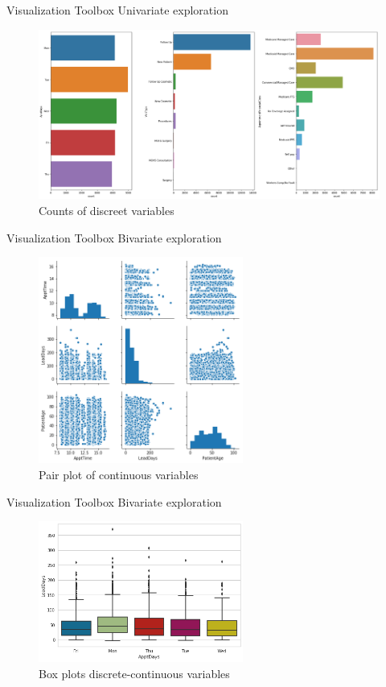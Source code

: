 \documentclass[10pt]{beamer}
\begin{document}
\begin{frame}{Visualization Toolbox}
Univariate exploration
	\begin{figure}	
		\caption{Counts of discreet variables}
		\includegraphics[width=1.1\textwidth, center, trim=0cm 0cm 0 0cm]{images/cat_columns.png}
	\end{figure}
\end{frame}

\begin{frame}{Visualization Toolbox}
Bivariate exploration
	\begin{figure}	
		\caption{Pair plot of continuous variables}
		\includegraphics[width=0.6\textwidth, center, trim=0cm 0cm 0 0cm]{images/pair_plot.png}
	\end{figure}
\end{frame}

\begin{frame}{Visualization Toolbox}
Bivariate exploration
	\begin{figure}	
		\caption{Box plots discrete-continuous variables}
		\includegraphics[width=0.6\textwidth, center, trim=0cm 0cm 0 0cm]{images/boxplot_days.png}
	\end{figure}
\end{frame}
\end{document}
